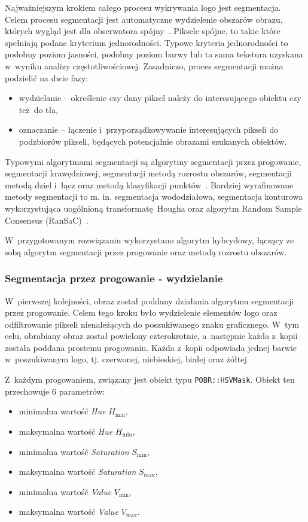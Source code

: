Najważniejszym krokiem całego procesu wykrywania logo \bk jest segmentacja. Celem procesu segmentacji jest automatyczne wydzielenie obszarów obrazu, których wygląd jest dla obserwatora spójny~\cite{pobr:wyklad}. Piksele spójne, to takie które spełniają podane kryterium jednorodności. Typowe kryteria jednorodności to podobny poziom jasności, podobny poziom barwy lub ta sama tekstura uzyskana w~wyniku analizy częstotliwościowej. Zasadniczo, proces segmentacji można podzielić na dwie fazy:
\begin{itemize}
    \item wydzielanie -- określenie czy dany piksel należy do interesującego obiektu czy też do tła,
    \item oznaczanie -- łączenie i~przyporządkowywanie interesujących pikseli do podzbiorów pikseli, będących potencjalnie obrazami szukanych obiektów.
\end{itemize}

Typowymi algorytmami segmentacji są algorytmy segmentacji przez progowanie, segmentacji krawędziowej, segmentacji metodą rozrostu obszarów, segmentacji metodą dziel i~łącz oraz metodą klasyfikacji punktów~\cite{pobr:wyklad}. Bardziej wyrafinowane metody segmentacji to m. in. segmentacja wododziałowa, segmentacja konturowa wykorzystująca uogólnioną transformatę Hougha oraz algorytm Random Sample Consensus (RanSaC)~\cite{perm:wyklad}.

W~przygotowanym rozwiązaniu wykorzystano algorytm hybrydowy, łączący ze sobą algorytm segmentacji przez progowanie oraz metodą rozrostu obszarów.

\subsubsection{Segmentacja przez progowanie - wydzielanie}
W~pierwszej kolejności, obraz został poddany działania algorytmu segmentacji przez progowanie. Celem tego kroku było wydzielenie elementów logo \bk oraz odfiltrowanie pikseli nienależących do poszukiwanego znaku graficznego. W~tym celu, obrabiany obraz został powielony czterokrotnie, a~następnie każda z~kopii została poddana prostemu progowaniu. Każda z~kopii odpowiada jednej barwie w~poszukiwanym logo, tj. czerwonej, niebieskiej, białej oraz żółtej.

Z~każdym progowaniem, związany jest obiekt typu \texttt{POBR::HSVMask}. Obiekt ten przechowuje 6 parametrów:
\begin{itemize}
    \item minimalna wartość \emph{Hue} $H_{\mathrm{min}}$,
    \item maksymalna wartość \emph{Hue} $H_{\mathrm{min}}$,
    \item minimalna wartość \emph{Saturation} $S_{\mathrm{min}}$,
    \item maksymalna wartość \emph{Saturation} $S_{\mathrm{max}}$,
    \item minimalna wartość \emph{Value} $V_{\mathrm{min}}$,
    \item maksymalna wartość \emph{Value} $V_{\mathrm{max}}$.
\end{itemize}


